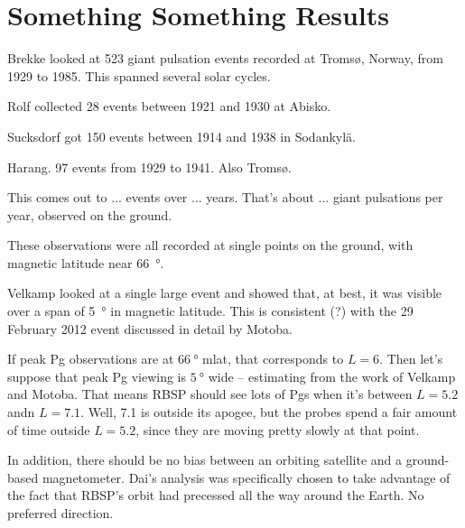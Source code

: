 
\section{Something Something Results}

Brekke\cite{brekke_1987} looked at 523 giant pulsation events recorded at Troms{\o}, Norway, from 1929 to 1985. This spanned several solar cycles. 

Rolf\cite{rolf_1931} collected 28 events between 1921 and 1930 at Abisko. 

Sucksdorf\cite{sucksdorf_1939} got 150 events between 1914 and 1938 in Sodankyl{\"a}. 

Harang\cite{harang_1941}. 97 events from 1929 to 1941. Also Troms{\o}. 

This comes out to ... events over ... years. That's about ... giant pulsations per year, observed on the ground. 



These observations were all recorded at single points on the ground, with magnetic latitude near \SI{66}{\degree}. 

Velkamp\cite{veldkamp_1960} looked at a single large event and showed that, at best, it was visible over a span of \SI{5}{\degree} in magnetic latitude. This is consistent (?) with the 29 February 2012 event discussed in detail by Motoba\cite{motoba_2015}. 

If peak Pg observations are at $\SI{66}{\degree}$ mlat, that corresponds to $L = 6$. Then let's suppose that peak Pg viewing is $\SI{5}{\degree}$ wide -- estimating from the work of Velkamp and Motoba. That means RBSP should see lots of Pgs when it's between $L = 5.2$ andn $L = 7.1$. Well, \SI{7.1}{\RE} is outside its apogee, but the probes spend a fair amount of time outside $L = 5.2$, since they are moving pretty slowly at that point. 

In addition, there should be no bias between an orbiting satellite and a ground-based magnetometer. Dai's analysis was specifically chosen to take advantage of the fact that RBSP's orbit had precessed all the way around the Earth. No preferred direction. 

